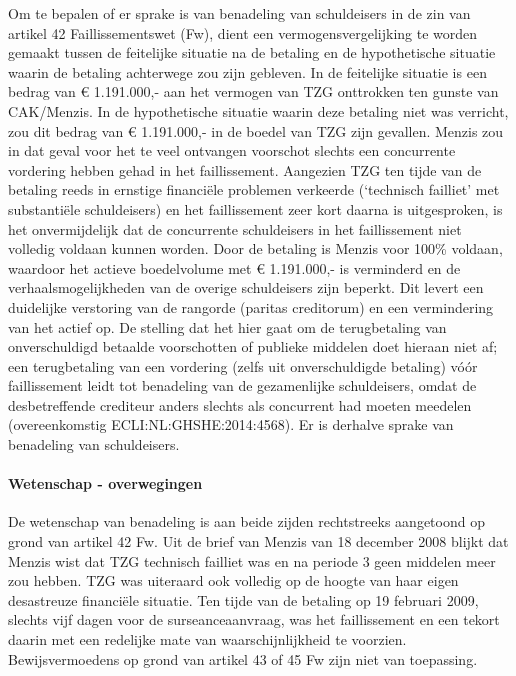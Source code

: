 \documentclass[
  dutch,
  a4paper,
]{article}
\begin{document}
Om te bepalen of er sprake is van benadeling van schuldeisers in de zin van artikel 42 Faillissementswet (Fw), dient een vermogensvergelijking te worden gemaakt tussen de feitelijke situatie na de betaling en de hypothetische situatie waarin de betaling achterwege zou zijn gebleven. In de feitelijke situatie is een bedrag van € 1.191.000,- aan het vermogen van TZG onttrokken ten gunste van CAK/Menzis. In de hypothetische situatie waarin deze betaling niet was verricht, zou dit bedrag van € 1.191.000,- in de boedel van TZG zijn gevallen. Menzis zou in dat geval voor het te veel ontvangen voorschot slechts een concurrente vordering hebben gehad in het faillissement. Aangezien TZG ten tijde van de betaling reeds in ernstige financiële problemen verkeerde (`technisch failliet' met substantiële schuldeisers) en het faillissement zeer kort daarna is uitgesproken, is het onvermijdelijk dat de concurrente schuldeisers in het faillissement niet volledig voldaan kunnen worden. Door de betaling is Menzis voor 100\% voldaan, waardoor het actieve boedelvolume met € 1.191.000,- is verminderd en de verhaalsmogelijkheden van de overige schuldeisers zijn beperkt. Dit levert een duidelijke verstoring van de rangorde (paritas creditorum) en een vermindering van het actief op. De stelling dat het hier gaat om de terugbetaling van onverschuldigd betaalde voorschotten of publieke middelen doet hieraan niet af; een terugbetaling van een vordering (zelfs uit onverschuldigde betaling) vóór faillissement leidt tot benadeling van de gezamenlijke schuldeisers, omdat de desbetreffende crediteur anders slechts als concurrent had moeten meedelen (overeenkomstig ECLI:NL:GHSHE:2014:4568). Er is derhalve sprake van benadeling van schuldeisers.

\paragraph{Wetenschap - overwegingen}\label{wetenschap---overwegingen-89}

De wetenschap van benadeling is aan beide zijden rechtstreeks aangetoond op grond van artikel 42 Fw. Uit de brief van Menzis van 18 december 2008 blijkt dat Menzis wist dat TZG technisch failliet was en na periode 3 geen middelen meer zou hebben. TZG was uiteraard ook volledig op de hoogte van haar eigen desastreuze financiële situatie. Ten tijde van de betaling op 19 februari 2009, slechts vijf dagen voor de surseanceaanvraag, was het faillissement en een tekort daarin met een redelijke mate van waarschijnlijkheid te voorzien. Bewijsvermoedens op grond van artikel 43 of 45 Fw zijn niet van toepassing.
\end{document}

